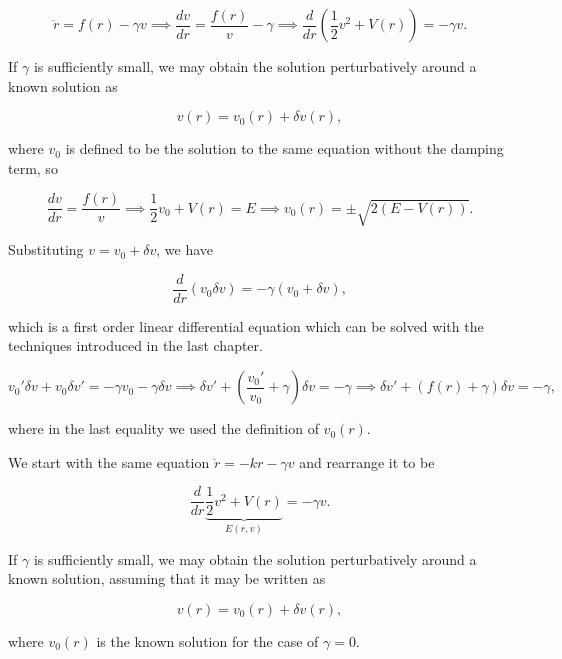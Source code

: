 \documentclass[english,a4paper,12pt]{report}
\begin{document}
\begin{equation}
    \ddot{r} = f(r) -\gamma v \implies \frac{dv}{dr} = \frac{f(r)}{v} - \gamma \implies \frac{d}{dr} (\frac{1}{2} v^2 + V(r) ) = -\gamma v. 
\end{equation}

If \(\gamma \) is sufficiently small, we may obtain the solution perturbatively around a known solution as

\begin{equation}
    v(r) = v_0 (r) + \delta v(r), 
\end{equation}

where \(v_0 \) is defined to be the solution to the same equation without the damping term, so

\begin{equation}
    \frac{dv}{dr} = \frac{f(r)}{v} \implies \frac{1}{2} v_0  + V(r) = E \implies v_0 (r) = \pm \sqrt{2(E-V(r))} .  
\end{equation}

Substituting \(v = v_0  + \delta v\), we have 

\begin{equation}
    \frac{d}{dr}(v_0 \delta v) = -\gamma (v_0 +\delta v), 
\end{equation}

which is a first order linear differential equation which can be solved with the techniques introduced in the last chapter.

\begin{equation}
    v_0 '\delta v + v_0  \delta v' = -\gamma v_0 -\gamma \delta v \implies \delta v' + \left( \frac{v_0 '}{v_0 } + \gamma  \right) \delta v = -\gamma  \implies \delta v' + (f(r) + \gamma )\delta v = -\gamma,
\end{equation}

where in the last equality we used the definition of \(v_0 (r)\). 










{}
{We start with the same equation \(\ddot{r} = -kr-\gamma v \) and rearrange it to be

\begin{equation}
    \frac{d}{dr}\underbrace{\frac{1}{2}v^2+V(r) }_{E(r,v)} = -\gamma v. 
\end{equation}

If \(\gamma \) is sufficiently small, we may obtain the solution perturbatively around a known solution, assuming that it may be written as 

\begin{equation}
    v(r) = v_0 (r) + \delta v(r),
\end{equation}

where \(v_0 (r)\) is the known solution for the case of \(\gamma  = 0\).   

}  
\end{document}

